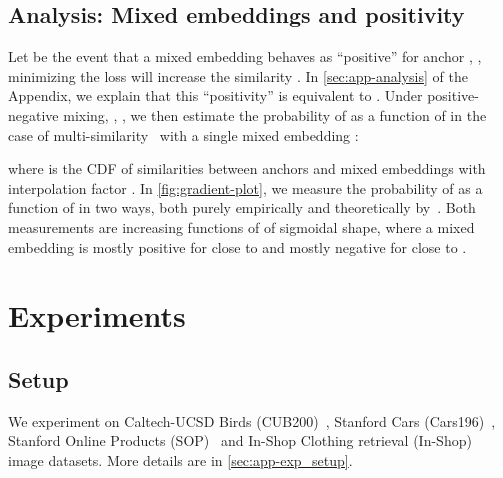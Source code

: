 \documentclass{article}
\makeatletter
\renewcommand\paragraph{\@startsection{paragraph}{4}{\z@}{1ex}{-1em}{\normalfont\normalsize\bfseries}}
\makeatother
\begin{document}
\subsection{Analysis: Mixed embeddings and positivity}
\label{sec:analysis}

Let  be the event that a mixed embedding  behaves as ``positive'' for anchor , \ie, minimizing the loss  will increase the similarity . In \autoref{sec:app-analysis} of the Appendix, we explain that this ``positivity'' is equivalent to . Under positive-negative mixing, \ie, , we then estimate the probability of  as a function of  in the case of multi-similarity~ with a single mixed embedding :

where  is the CDF of similarities  between anchors  and mixed embeddings  with interpolation factor . In \autoref{fig:gradient-plot}, we measure the probability of  as a function of  in two ways, both purely empirically and theoretically by~. Both measurements are increasing functions of  of sigmoidal shape, where a mixed embedding is mostly positive for  close to  and mostly negative for  close to .




 \section{Experiments}
\label{sec:exp}





\begingroup
\setlength{\columnsep}{16pt}














\subsection{Setup}
\label{sec:exp-set}



\paragraph{Datasets}

We experiment on Caltech-UCSD Birds (CUB200)~\citep{cub}, Stanford Cars (Cars196)~\citep{cars}, Stanford Online Products (SOP)~\citep{oh2016deep} and In-Shop Clothing retrieval (In-Shop)~\citep{deepfashion} image datasets. More details are in \autoref{sec:app-exp_setup}.
\end{document}
